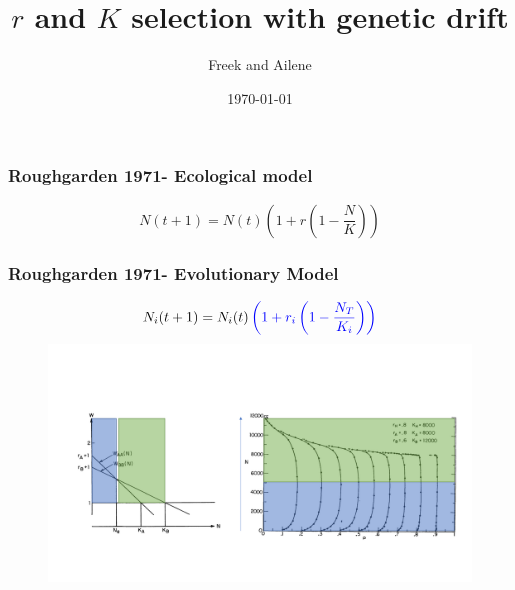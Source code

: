 \documentclass{beamer}
\title[lab meeting]{\(r\) and \(K\) selection with genetic drift } %
\author{Freek and Ailene} %
\date{\today} %
\begin{document}
\begin{frame}
\titlepage %
\end{frame}

\begin{frame}
\frametitle{Roughgarden 1971- Ecological model}
\begin{equation*}
N(t+1)=N(t)\left(1+r\left(1-\frac{N}{K}\right)\right)
\end{equation*}
\end{frame}

\begin{frame}
\frametitle{Roughgarden 1971- Evolutionary Model} 
\begin{figure}[H]
\centering
\begin{equation*}
N_i(t+1)=N_i(t)\begingroup\color{blue}\left(1+r_i\left(1-\frac{N_T}{K_i}\right)\right)\endgroup
\end{equation*}
\includegraphics[width=1\textwidth]{Roughgarden.pdf}
\end{figure}
\end{frame}
\end{document}
